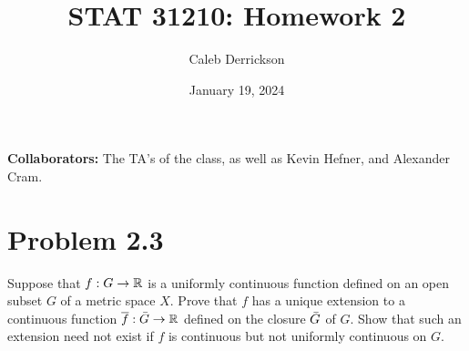 

\title{STAT 31210: Homework 2}
\author{Caleb Derrickson}
\date{January 19, 2024}


\onehalfspacing
\maketitle
\allowdisplaybreaks
{\color{cit}\vspace{2mm}\noindent\textbf{Collaborators:}} The TA's of the class, as well as Kevin Hefner, and Alexander Cram.

\tableofcontents

\newpage
\section{Problem 2.3}
Suppose that $f: G\rightarrow \mathbb{R}$ is a uniformly continuous function defined on an open subset $G$ of a metric space $X$. Prove that $f$ has a unique extension to a continuous function $\overline{f} : \Bar{G} \rightarrow \mathbb{R}$ defined on the closure $\Bar{G}$ of $G$. Show that such an extension need not exist if $f$ is continuous but not uniformly continuous on $G$.

\newcommand{\fbar}{\Bar{f}}

